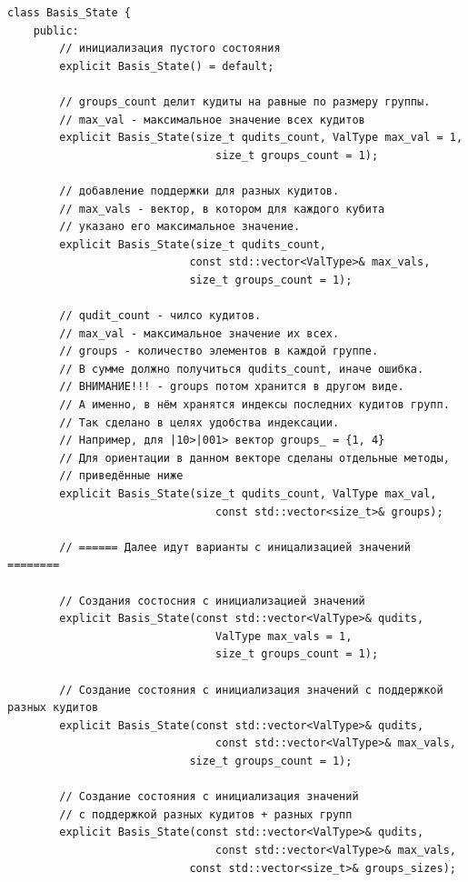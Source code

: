 \documentclass[12pt,fleqn]{article}
\begin{document}
\begin{mdframed}[linecolor=black, topline=true, bottomline=true,
    leftline=false, rightline=false]
\begin{verbatim}
class Basis_State {
    public:
        // инициализация пустого состояния
        explicit Basis_State() = default;

        // groups_count делит кудиты на равные по размеру группы.
        // max_val - максимальное значение всех кудитов
        explicit Basis_State(size_t qudits_count, ValType max_val = 1,
                                size_t groups_count = 1);

        // добавление поддержки для разных кудитов. 
        // max_vals - вектор, в котором для каждого кубита
        // указано его максимальное значение.
        explicit Basis_State(size_t qudits_count, 
                            const std::vector<ValType>& max_vals,
                            size_t groups_count = 1);

        // qudit_count - чилсо кудитов. 
        // max_val - максимальное значение их всех. 
        // groups - количество элементов в каждой группе. 
        // В сумме должно получиться qudits_count, иначе ошибка.
        // ВНИМАНИЕ!!! - groups потом хранится в другом виде. 
        // А именно, в нём хранятся индексы последних кудитов групп. 
        // Так сделано в целях удобства индексации.
        // Например, для |10>|001> вектор groups_ = {1, 4}
        // Для ориентации в данном векторе сделаны отдельные методы,
        // приведённые ниже
        explicit Basis_State(size_t qudits_count, ValType max_val, 
                                const std::vector<size_t>& groups);

        // ====== Далее идут варианты с иницализацией значений ========

        // Создания состосния с инициализацией значений
        explicit Basis_State(const std::vector<ValType>& qudits, 
                                ValType max_vals = 1, 
                                size_t groups_count = 1);

        // Создание состояния с инициализация значений с поддержкой разных кудитов
        explicit Basis_State(const std::vector<ValType>& qudits,
                                const std::vector<ValType>& max_vals,
                            size_t groups_count = 1);

        // Создание состояния с инициализация значений
        // с поддержкой разных кудитов + разных групп
        explicit Basis_State(const std::vector<ValType>& qudits, 
                                const std::vector<ValType>& max_vals,
                            const std::vector<size_t>& groups_sizes);


\end{verbatim}
\end{mdframed}
\end{document}
